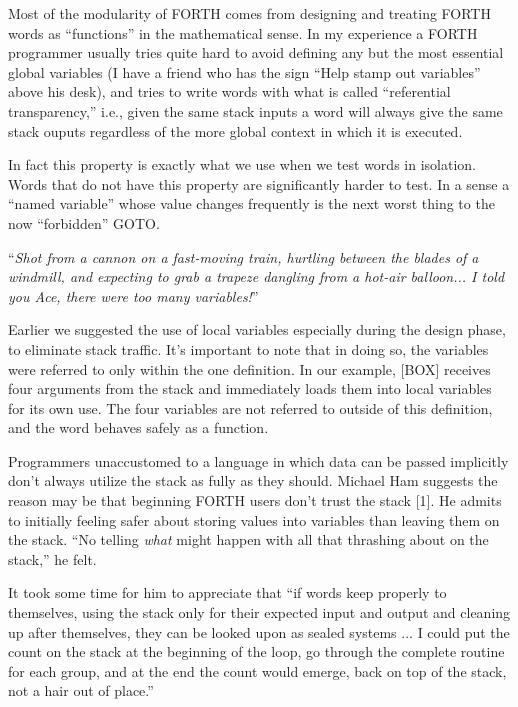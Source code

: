 Most of the modularity of FORTH comes from designing and treating
FORTH words as ``functions'' in the mathematical sense. In my experience
a FORTH programmer usually tries quite hard to avoid defining any but
the most essential global variables (I have a friend who has the sign ``Help
stamp out variables'' above his desk), and tries to write words with what is
called ``referential transparency,'' i.e., given the same stack inputs a word
will always give the same stack ouputs regardless of the more global
context in which it is executed.

In fact this property is exactly what we use when we test words in isolation.
Words that do not have this property are significantly harder to test. In a
sense a ``named variable'' whose value changes frequently is the next worst
thing to the now ``forbidden'' GOTO.


``\emph{Shot from a cannon on a fast-moving train, hurtling between the
blades of a windmill, and expecting to grab a trapeze dangling from a
hot-air balloon... I told you Ace, there were too many variables!}''

Earlier we suggested the use of local variables especially during the
design phase, to eliminate stack traffic. It's important to note that in
doing so, the variables were referred to only within the one definition. In
our example, [BOX] receives four arguments from the stack and immediately
loads them into local variables for its own use. The four variables are not
referred to outside of this definition, and the word behaves safely as a
function.

Programmers unaccustomed to a language in which data can be
passed implicitly don't always utilize the stack as fully as they should.
Michael Ham suggests the reason may be that beginning FORTH users
don't trust the stack [1]. He admits to initially feeling safer about storing
values into variables than leaving them on the stack. ``No telling \emph{what}
might happen with all that thrashing about on the stack,'' he felt.

It took some time for him to appreciate that ``if words keep properly
to themselves, using the stack only for their expected input and output
and cleaning up after themselves, they can be looked upon as sealed
systems ... I could put the count on the stack at the beginning of the
loop, go through the complete routine for each group, and at the end the
count would emerge, back on top of the stack, not a hair out of place.''


